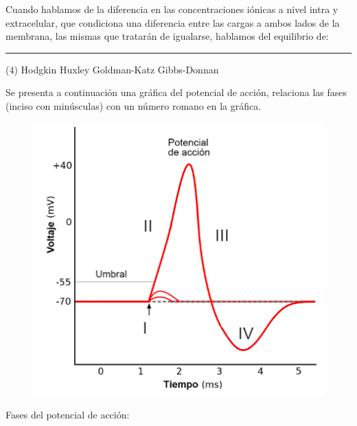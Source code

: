 \documentclass[12pt, letter]{exam}
\begin{document}
\begin{questions}
    \question Cuando hablamos de la diferencia en las concentraciones iónicas a nivel intra y extracelular, que condiciona una diferencia entre las cargas a ambos lados de la membrana, las mismas que tratarán de igualarse, hablamos del equilibrio de: \rule{2cm}{0.1mm}
    \begin{tasks}(4)
        \task Hodgkin
        \task Huxley
        \task Goldman-Katz
        \task Gibbs-Donnan
    \end{tasks}
    \question Se presenta a continuación una gráfica del potencial de acción, relaciona las fases (inciso con minúsculas) con un número romano en la gráfica.
    \begin{figure}[H]
        \centering
        \includegraphics[scale=0.75]{Imagenes/Potencial_Accion_07.png}
    \end{figure}

    Fases del potencial de acción:
    \renewcommand{\thepartno}{\alph{partno}}
    \begin{multicols}{2}
\end{multicols}
\end{questions}
\end{document}
